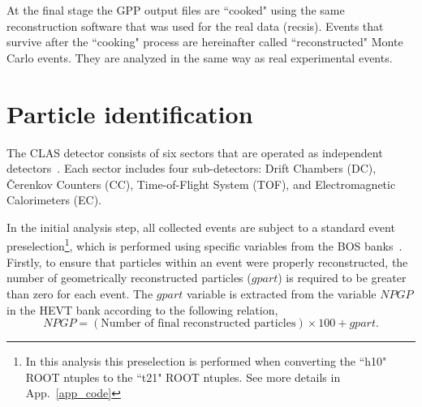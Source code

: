 
At the final stage the GPP output files are ``cooked" using the same reconstruction software that was used for the real data (recsis). Events that survive after the ``cooking" process are hereinafter called ``reconstructed" Monte Carlo events. They are analyzed in the same way as real experimental events. 




\section{Particle identification}
\label{Sect:part_id}
The CLAS detector consists of six sectors that are operated as independent detectors~\cite{Mecking:2003zu}. Each sector includes four sub-detectors: Drift Chambers (DC), \v Cerenkov Counters (CC), Time-of-Flight System (TOF), and Electromagnetic Calorimeters (EC).


In the initial analysis step, all collected events are subject to a standard event preselection\footnote[2]{In this analysis this preselection is performed when converting the ``h10" ROOT ntuples to the ``t21" ROOT ntuples. See more details in App.~\ref{app_code}}, which is performed using specific variables from the BOS banks~\cite{BOS:bank,Stepanyan:1999}. Firstly, to ensure that particles within an event were properly reconstructed, the number of geometrically reconstructed particles ($gpart$) is required to be greater than zero for each event. The $gpart$ variable is extracted from the variable $NPGP$ in the HEVT bank according to the following relation,
\begin{equation}
NPGP=(\text{Number of final reconstructed particles})\times100 + gpart.
\end{equation}

